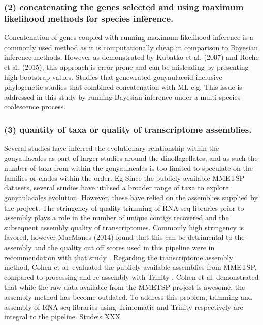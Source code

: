 \documentclass[12pt]{article}
\begin{document}
\subsubsection*{(2) concatenating the genes selected and using maximum likelihood methods for species inference.}
Concatenation of genes coupled with running maximum likelihood inference is a commonly used method as it is computationally cheap in comparison to Bayesian inference methods. 
However as demonstrated by Kubatko et al. (2007) and Roche et al. (2015), this approach is error prone and can be misleading by presenting high bootstrap values.
Studies that genewrated gonyaulacoid inclusive phylogenetic studies that combined concatenation with ML e.g. \cite{shalchian2006combined,zhang2007three,saldarriaga2004molecular,murray2005improving,hoppenrath2010dinoflagellate}
This issue is addressed in this study by running Bayesian inference under a multi-species coalescence process.
\subsubsection*{(3) quantity of taxa or quality of transcriptome assemblies.}
Several studies have inferred the evolutionary relationship within the gonyaulacales as part of larger studies around the dinoflagellates, and as such the number of taxa from within the gonyaulacales is too limited to speculate on the families or clades within the order. Eg \cite{shalchian2006combined,zhang2007three,saldarriaga2004molecular,hoppenrath2010dinoflagellate,murray2005improving}
Since the publicly available MMETSP datasets, several studies have utilised a broader range of taxa to explore gonyaulacales evolution. 
However, these have relied on the assemblies supplied by the project. 
The stringency of quality trimming of RNA-seq libraries prior to assembly plays a role in the number of unique contigs recovered and the subsequent assembly quality of transcriptomes. 
Commonly high stringency is favored, however MacManes (2014) found that this can be detrimental to the assembly and the quality cut off scores used in this pipeline were in recommendation with that study \cite{macmanes2014optimal}.
Regarding the transcriptome assembly method, Cohen et al. evaluated the publicly available assemblies from MMETSP, compared to processing and re-assembly with Trinity \cite{cohen-reass}. 
Cohen et al. demonstrated that while the raw data available from the MMETSP project is awesome, the assembly method has become outdated. 
To address this problem, trimming and assembly of RNA-seq libraries using Trimomatic and Trinity respectively are integral to the pipeline.
Studeis XXX
\end{document}

